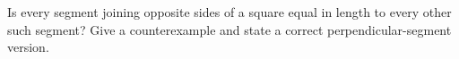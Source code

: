 Is every segment joining opposite sides of a square equal in length to every other such segment? Give a counterexample and state a correct perpendicular-segment version.
